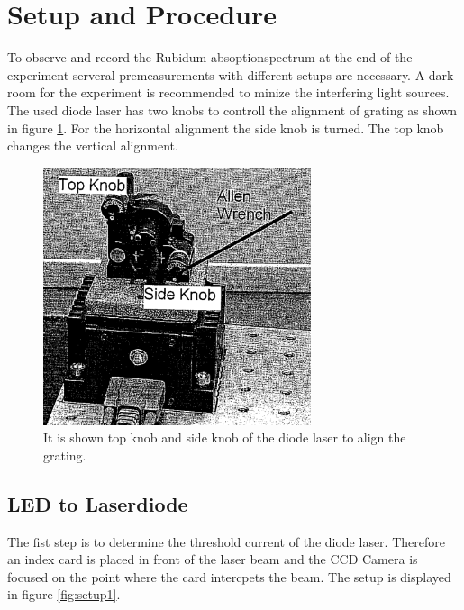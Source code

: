 \section{Setup and Procedure}
\label{sec:setup}
To observe and record the Rubidum absoptionspectrum at the end
of the experiment
serveral premeasurements with different setups are necessary.
A dark room for the experiment is recommended to minize the
interfering light sources.
The used diode laser has two knobs to controll the alignment of grating
as shown in figure \ref{fig:knobs}.
For the horizontal alignment the side knob is turned. The
top knob changes the vertical alignment.
\begin{figure}
  \centering
  \includegraphics[width=0.7\textwidth]{Laserknobs.png}
  \caption{It is shown top knob and side knob of the diode laser to align the grating.\cite{V61}}
  \label{fig:knobs}
\end{figure}


\subsection{LED to Laserdiode}
\label{subsec:LED_Laser}

The fist step is to determine the threshold current
of the diode laser.
Therefore an index card is placed in front of the laser beam and the CCD Camera
is focused on the point where the card intercpets the beam.
The setup is displayed
in figure \ref{fig:setup1}.

